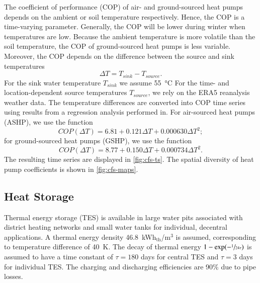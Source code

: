 The coefficient of performance (COP) of air- and ground-sourced heat pumps
depends on the ambient or soil temperature respectively. Hence, the COP is a
time-varying parameter. Generally, the COP will be lower during winter when
temperatures are low. Because the ambient temperature is more volatile than the
soil temperature, the COP of ground-sourced heat pumps is less variable.
Moreover, the COP depends on the difference between the source and sink
temperatures
\begin{equation}
    \Delta T = T_{sink} - T_{source}.
\end{equation}
For the sink water temperature $T_{sink}$ we assume \SI{55}{\celsius} For the
time- and location-dependent source temperatures $T_{source}$, we rely on the
ERA5 reanalysis weather data. The temperature differences are
converted into COP time series using results from a regression analysis
performed in. For air-sourced heat pumps
(ASHP), we use the function
\begin{equation}
    COP(\Delta T) = 6.81 + 0.121 \Delta T + 0.000630 \Delta T^2;
\end{equation}
for ground-sourced heat pumps (GSHP), we use the function
\begin{equation}
    COP(\Delta T) = 8.77 + 0.150 \Delta T + 0.000734 \Delta T^2.
\end{equation}
The resulting time series are displayed in \cref{fig:cfs-ts}.
The spatial diversity of heat pump coefficients is shown in \cref{fig:cfs-maps}.

\subsection{Heat Storage}
\label{sec:si:heat:storage}

Thermal energy storage (TES) is available in large water pits associated with
district heating networks and small water tanks for individual, decentral
applications. A thermal energy density 46.8~kWh$_{\text{th}}$/m$^3$ is assumed,
corresponding to temperature difference of \SI{40}{\kelvin}. The decay of
thermal energy $1-\exp(-\sfrac{1}{24\tau})$ is assumed to have a time constant
of $\tau=180$ days for central TES and $\tau=3$ days for individual TES. The
charging and discharging efficiencies are 90\% due to pipe losses.